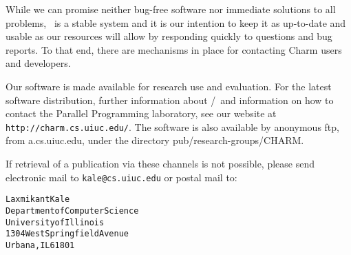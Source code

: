 While we can promise neither bug-free software nor immediate solutions   
to all problems, \charmpp\ is a stable system and it is our intention to
keep it as up-to-date and usable as our resources will allow
by responding quickly to questions and bug reports.  To that
end, there are mechanisms in place for contacting Charm users
and developers. 

Our software is made available for research use and evaluation.
For the latest software distribution, further information about
\converse{}/\charmpp\ and information on how to contact the Parallel
Programming laboratory, see our website at \texttt{http://charm.cs.uiuc.edu/}.
The software is also available by
anonymous ftp, from a.cs.uiuc.edu, under the directory
pub/research-groups/CHARM.  

If retrieval of a publication via these channels is not possible,
please send electronic mail to \texttt{kale@cs.uiuc.edu} or postal mail to:

\begin{alltt}
   Laxmikant Kale
   Department of Computer Science 
   University of Illinois 
   1304 West Springfield Avenue 
   Urbana, IL 61801 
\end{alltt}
